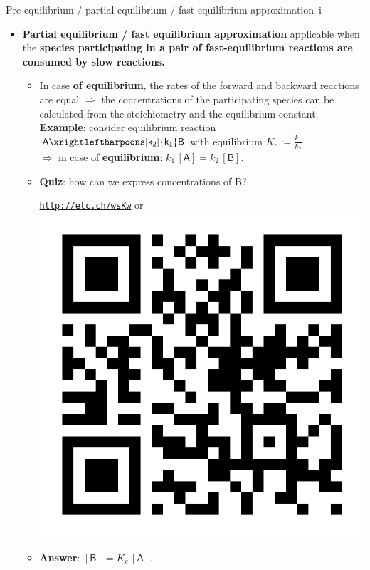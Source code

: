\begin{frame}{Pre-equilibrium / partial equilibrium / fast equilibrium approximation \,i}
	\small
	\begin{itemize}
		\item \alert{\bf Partial equilibrium / fast equilibrium approximation} applicable when the {\bf species participating 
		in a pair of fast-equilibrium reactions are consumed by slow reactions.}
			\begin{itemize}
			\item[(i)] In case {\bf of equilibrium}, the rates of the forward and backward reactions are equal $\Rightarrow$ 
			the concentrations of the participating species can be calculated from the stoichiometry and the equilibrium constant.\\
			{\bf Example}: consider equilibrium reaction $\mathsf{A \xrightleftharpoons[k_2]{k_1} B}$ with equilibrium $K_e := \tfrac{k_1}{k_2}$ \\
			$\Rightarrow$ in case of {\bf equilibrium}: $k_1 \, \mathsf{[A]} = k_2 \, \mathsf{[B]}$.
			\item \alert{\bf Quiz}: how can we express concentrations of B?
			\begin{center}
				\href{http://etc.ch/wsKw}{\textcolor{indigo(dye)}{\tt http://etc.ch/wsKw}} \quad or \quad 
				\includegraphics[height=0.18\columnwidth]{figures/chemical-kinetics/polls.png}
			\end{center}
			\vskip 10pt
			\hiddenpause
			\item  {\bf Answer}: $\mathsf{[B]} = K_e \, \mathsf{[A]}$.
			\end{itemize}	
	\end{itemize}
\end{frame}
